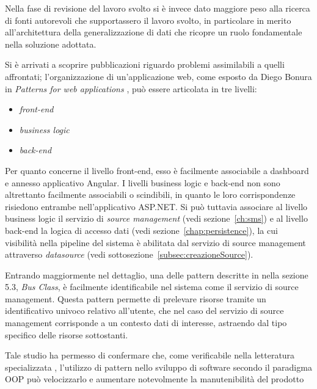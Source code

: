 
Nella fase di revisione del lavoro svolto si è invece dato maggiore peso alla ricerca di fonti autorevoli che supportassero il lavoro svolto, in particolare in merito all'architettura della generalizzazione di dati che ricopre un ruolo fondamentale nella soluzione adottata.

Si è arrivati a scoprire pubblicazioni riguardo problemi assimilabili a quelli affrontati; l'organizzazione di un'applicazione web, come esposto da Diego Bonura in \textit{Patterns for web applications} \cite{DBLP:conf/seke/BonuraCM02}, può essere articolata in tre livelli:
\begin{itemize}
\item
\textit{front-end}
\item
\textit{business logic}
\item
\textit{back-end}
\end{itemize}

Per quanto concerne il livello front-end, esso è facilmente associabile a dashboard e annesso applicativo Angular.
I livelli business logic e back-end non sono altrettanto facilmente associabili o scindibili, in quanto le loro corrispondenze risiedono entrambe nell'applicativo ASP.NET. Si può tuttavia associare al livello business logic il servizio di \textit{source management} (vedi sezione~\ref{ch:sms}) e al livello back-end la logica di accesso dati (vedi sezione~\ref{chap:persistence}), la cui visibilità nella pipeline del sistema è abilitata dal servizio di source management attraverso \textit{datasource} (vedi sottosezione~\ref{subsec:creazioneSource}).

Entrando maggiormente nel dettaglio, una delle pattern descritte in \cite{DBLP:conf/seke/BonuraCM02} nella sezione 5.3, \textit{Bus Class}, è facilmente identificabile nel sistema come il servizio di source management. Questa pattern permette di prelevare risorse tramite un identificativo univoco relativo all'utente, che nel caso del servizio di source management corrisponde a un contesto dati di interesse, astraendo dal tipo specifico delle risorse sottostanti.

Tale studio ha permesso di confermare che, come verificabile nella letteratura specializzata \cite{GOF}, l'utilizzo di pattern nello sviluppo di software secondo il paradigma OOP può velocizzarlo e aumentare notevolmente la manutenibilità del prodotto

